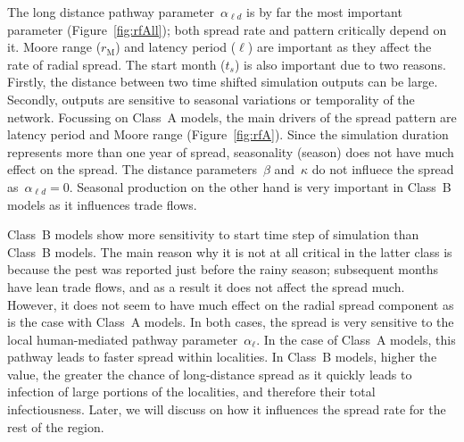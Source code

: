 \documentclass[11pt]{article}
\newcommand{\afm}{\alpha_{\ell}}
\newcommand{\ald}{\alpha_{\ell d}}
\newcommand{\mooreRange}{r_\mathrm{M}}
\theoremstyle{definition}
\begin{document}
The long distance pathway parameter~$\ald$ is by far the most important
parameter (Figure~\ref{fig:rfAll}); both spread rate and pattern critically
depend on it. Moore range ($\mooreRange$) and latency period ($\ell$) are
important as they affect the rate of radial spread. The start month ($t_s$)
is also important due to two reasons. Firstly, the distance between two
time shifted simulation outputs can be large. Secondly, outputs are
sensitive to seasonal variations or temporality of the network. Focussing
on Class~A models, the main drivers of the spread pattern are latency
period and Moore range (Figure~\ref{fig:rfA}). Since the simulation
duration represents more than one year of spread, seasonality (season) does
not have much effect on the spread. The distance parameters~$\beta$
and~$\kappa$ do not influece the spread as~$\ald=0$. Seasonal production on
the other hand is very important in Class~B models as it influences trade
flows.

Class~B models show more sensitivity to start time step of simulation than
Class~B models. The main reason why it is not at all critical in the latter
class is because the pest was reported just before the rainy season;
subsequent months have lean trade flows, and as a result it does not affect
the spread much. However, it does not seem to have much effect on the
radial spread component as is the case with Class~A models. In both cases,
the spread is very sensitive to the local human-mediated pathway
parameter~$\afm$. In the case of Class~A models, this pathway leads to
faster spread within localities. In Class~B models, higher the value, the
greater the chance of long-distance spread as it quickly leads to infection
of large portions of the localities, and therefore their total
infectiousness. Later, we will discuss on how it influences the spread rate
for the rest of the region.
\end{document}
